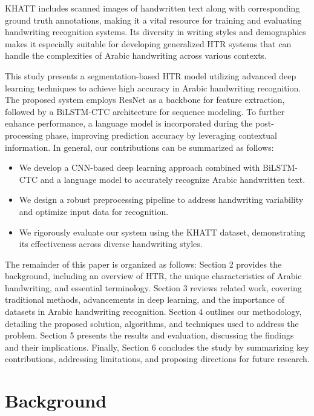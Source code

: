 \documentclass[conference]{IEEEtran}
\begin{document}
KHATT includes scanned images of handwritten text along with corresponding ground truth annotations, making it a vital resource for training and evaluating handwriting recognition systems. Its diversity in writing styles and demographics makes it especially suitable for developing generalized HTR systems that can handle the complexities of Arabic handwriting across various contexts. 


This study presents a segmentation-based HTR model utilizing advanced deep learning techniques to achieve high accuracy in Arabic handwriting recognition. The proposed system employs ResNet as a backbone for feature extraction, followed by a BiLSTM-CTC architecture for sequence modeling. To further enhance performance, a language model is incorporated during the post-processing phase, improving prediction accuracy by leveraging contextual information. In general, our contributions can be summarized as follows:


\begin{itemize}
    \item We develop a CNN-based deep learning approach combined with BiLSTM-CTC and a language model to accurately recognize Arabic handwritten text.
    \item We design a robust preprocessing pipeline to address handwriting variability and optimize input data for recognition.
    \item We rigorously evaluate our system using the KHATT dataset, demonstrating its effectiveness across diverse handwriting styles.
\end{itemize}

The remainder of this paper is organized as follows: Section 2 provides the background, including an overview of HTR, the unique characteristics of Arabic handwriting, and essential terminology. Section 3 reviews related work, covering traditional methods, advancements in deep learning, and the importance of datasets in Arabic handwriting recognition. Section 4 outlines our methodology, detailing the proposed solution, algorithms, and techniques used to address the problem. Section 5 presents the results and evaluation, discussing the findings and their implications. Finally, Section 6 concludes the study by summarizing key contributions, addressing limitations, and proposing directions for future research.


\section{Background}
\end{document}
